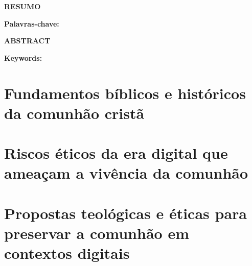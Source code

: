\documentclass[12pt,a4paper]{article}
\begin{document}


\hypersetup{pageanchor=false}  %







\newpage
\pagestyle{plain}
\renewcommand{\baselinestretch}{1.5}
\normalsize


\newpage
\begin{center}
    \large \textbf{\MakeUppercase{Resumo}}
\end{center}

\vspace{1cm}

\justifying


\vspace{0.5cm}

\noindent
\textbf{Palavras-chave:} \textit{\palavrasChave}

\newpage
\begin{center}
    \large \textbf{\MakeUppercase{Abstract}}
\end{center}

\vspace{1cm}

\justifying


\vspace{0.5cm}

\noindent
\textbf{Keywords:} \textit{\keywords}

\newpage
\thispagestyle{empty}
\tableofcontents

\newpage
\pagestyle{plain}
\renewcommand{\baselinestretch}{1.5}
\normalsize
\section{Fundamentos bíblicos e históricos da comunhão cristã}

\newpage
\pagestyle{plain}
\renewcommand{\baselinestretch}{1.5}
\normalsize
\section{Riscos éticos da era digital que ameaçam a vivência da comunhão}

\newpage
\pagestyle{plain}
\renewcommand{\baselinestretch}{1.5}
\normalsize
\section{Propostas teológicas e éticas para preservar a comunhão em contextos digitais}

\newpage

\end{document}
